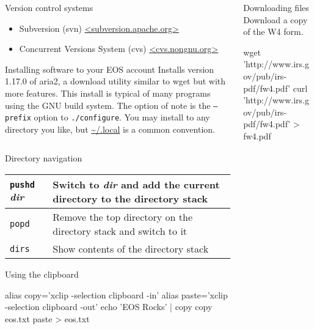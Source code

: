 \documentclass{beamer}
\begin{document}
\begin{frame}[fragile]{}
\begin{columns}[T]
\begin{column}{0.33\textwidth}
\begin{block}{Version control systems}
\begin{itemize}
\begin{itemize}
          \item Subversion (svn) \url{<subversion.apache.org>}
          \item Concurrent Versions System (cvs) \url{<cvs.nongnu.org>}
          \end{itemize}
        \end{itemize}
      \end{block}
      \begin{block}{Installing software to your EOS account}
        Installs version 1.17.0 of aria2, a download utility similar to wget but with more features. This install is typical of many programs using the GNU build system. The option of note is the \texttt{--prefix} option to \texttt{./configure}. You may install to any directory you like, but \url{\~/.local} is a common convention. \\
        {\scriptsize \inputminted[tabsize=2,frame=single]{bash}{scripts/install-aria2.bash}}
      \end{block}
      \begin{block}{Directory navigation}
        \begin{tabu} to 0.9\linewidth { X X }
          \texttt{pushd} \textit{dir} & Switch to \textit{dir} and add the current directory to the directory stack \\ \hline
          \texttt{popd} & Remove the top directory on the directory stack and switch to it \\ \hline
          \texttt{dirs} & Show contents of the directory stack
        \end{tabu}
      \end{block}
      \begin{block}{Using the clipboard}
        \begin{bashcode}
          alias copy='xclip -selection clipboard -in'
          alias paste='xclip -selection clipboard -out'
          echo 'EOS Rocks' | copy
          copy eos.txt
          paste > eos.txt
        \end{bashcode}
      \end{block}
    \end{column}
    \begin{column}{0.33\textwidth}
      \begin{block}{Downloading files}
        Download a copy of the W4 form.
        \begin{bashcode}
          wget 'http://www.irs.gov/pub/irs-pdf/fw4.pdf'
          curl 'http://www.irs.gov/pub/irs-pdf/fw4.pdf' > fw4.pdf
        \end{bashcode}

\end{block}
\end{column}
\end{columns}
\end{frame}
\end{document}
